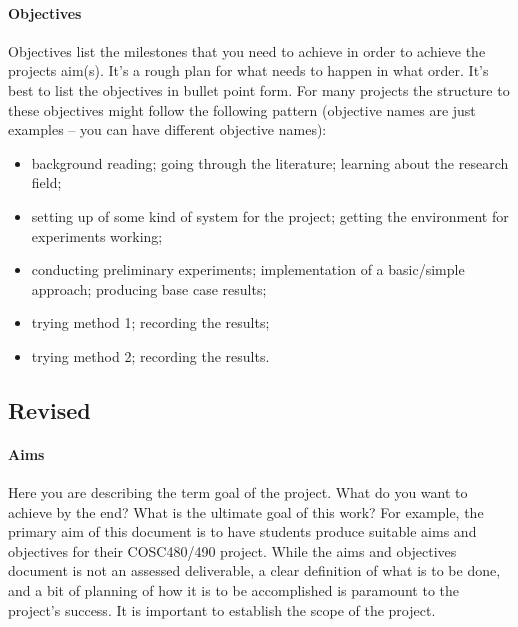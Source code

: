 \documentclass[12pt]{article}
\begin{document}
\paragraph{Objectives}
Objectives list the milestones that you need to achieve in order to achieve the projects aim(s). It's a rough plan for what needs to happen in what order. It's best to list the objectives in bullet point form. For many projects the structure to these objectives might follow the following pattern (objective names are just examples -- you can have different objective names):    
\begin{itemize}[noitemsep]
\item background reading; going through the literature; learning about the research field;
\item setting up of some kind of system for the project; getting the environment for experiments working;
\item conducting preliminary experiments; implementation of a basic/simple approach; producing base case results;
\item trying method 1; recording the results;
\item trying method 2; recording the results.
\end{itemize}

\subsection*{Revised}

\paragraph{Aims}
Here you are describing the term goal of the project. What do you want to achieve by the end?  What is the ultimate goal of this work?  For example, the primary aim of this document is to have students produce suitable aims and objectives for their COSC480/490 project. While the aims and objectives document is not an assessed deliverable, a clear definition of what is to be done, and a bit of planning of how it is to be accomplished is paramount to the project's success. It is important to establish the scope of the project.
\end{document}
